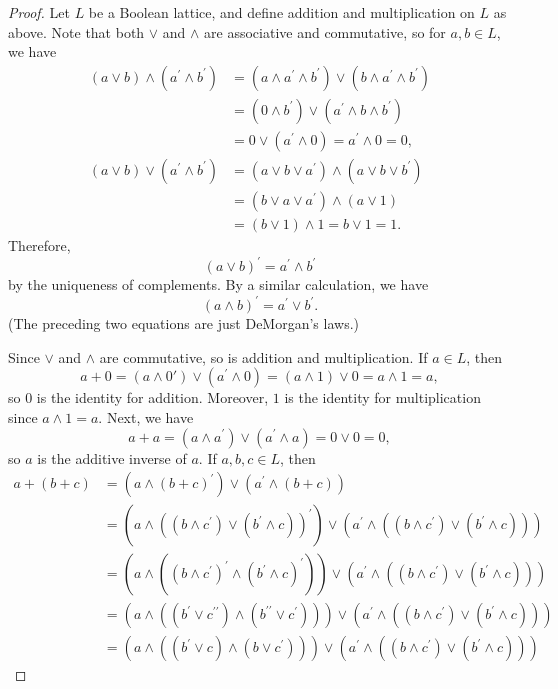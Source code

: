 \begin{proof}
Let $L$ be a Boolean lattice, and define addition and multiplication on $L$ as above.
Note that both $\vee$ and $\wedge$ are associative and commutative, so for $a,b\in L$, we have
\begin{align*}
(a \vee b) \wedge (a^\prime \wedge b^\prime)
&= (a \wedge a^\prime \wedge b^\prime) \vee (b \wedge a^\prime \wedge b^\prime)
\\&= (0 \wedge b^\prime) \vee (a^\prime \wedge b \wedge b^\prime)
\\&= 0 \vee (a^\prime \wedge 0)
= a^\prime \wedge 0
= 0,
\\(a \vee b) \vee (a^\prime \wedge b^\prime)
&= (a \vee b \vee a^\prime) \wedge (a \vee b \vee b^\prime)
\\&= (b \vee a \vee a^\prime) \wedge (a \vee 1)
\\&= (b \vee 1) \wedge 1
= b \vee 1
= 1.
\end{align*}
Therefore,
\begin{equation*}
(a \vee b)^\prime = a^\prime \wedge b^\prime
\end{equation*}
by the uniqueness of complements.
By a similar calculation, we have
\begin{equation*}
(a \wedge b)^\prime = a^\prime \vee b^\prime.
\end{equation*}
(The preceding two equations are just DeMorgan's laws.)


Since $\vee$ and $\wedge$ are commutative, so is addition and multiplication.
If $a \in L$, then
\begin{equation*}
a + 0
= (a \wedge 0') \vee (a^\prime \wedge 0)
= (a \wedge 1) \vee 0
= a \wedge 1
= a,
\end{equation*}
so $0$ is the identity for addition.
Moreover, $1$ is the identity for multiplication since $a \wedge 1 = a$.
Next, we have
\begin{equation*}
a + a
= (a \wedge a^\prime) \vee (a^\prime \wedge a)
= 0 \vee 0
= 0,
\end{equation*}
so $a$ is the additive inverse of $a$.
If $a,b,c\in L$, then
\begin{align*}
a + (b + c)
&= (a \wedge (b + c)^\prime) \vee (a^\prime \wedge (b + c))
\\&= (a \wedge ((b \wedge c^\prime) \vee (b^\prime \wedge c))^\prime) \vee (a^\prime \wedge ((b \wedge c^\prime) \vee (b^\prime \wedge c)))
\\&= (a \wedge ((b \wedge c^\prime)^\prime \wedge (b^\prime \wedge c)^\prime)) \vee (a^\prime \wedge ((b \wedge c^\prime) \vee (b^\prime \wedge c)))
\\&= (a \wedge ((b^\prime \vee c^{\prime\prime}) \wedge (b^{\prime\prime} \vee c^\prime))) \vee (a^\prime \wedge ((b \wedge c^\prime) \vee (b^\prime \wedge c)))
\\&= (a \wedge ((b^\prime \vee c) \wedge (b \vee c^\prime))) \vee (a^\prime \wedge ((b \wedge c^\prime) \vee (b^\prime \wedge c)))
\end{align*}




\end{proof}
